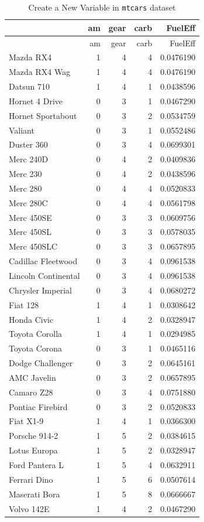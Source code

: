 \documentclass[
  letterpaper,
  paper =a4,
  twoside,
  openright,
  headsepline,
  footsepline,
  listof = totocnumbered,
  chapterprefix = true,
  firstiscover]{scrbook}
\begin{document}
\begin{longtable}[]{@{}lrrrr@{}}
\caption{Create a New Variable in \texttt{mtcars}
dataset}\tabularnewline
\toprule\noalign{}
& am & gear & carb & FuelEff \\
\midrule\noalign{}
\endfirsthead
\toprule\noalign{}
& am & gear & carb & FuelEff \\
\midrule\noalign{}
\endhead
\bottomrule\noalign{}
\endlastfoot
Mazda RX4 & 1 & 4 & 4 & 0.0476190 \\
Mazda RX4 Wag & 1 & 4 & 4 & 0.0476190 \\
Datsun 710 & 1 & 4 & 1 & 0.0438596 \\
Hornet 4 Drive & 0 & 3 & 1 & 0.0467290 \\
Hornet Sportabout & 0 & 3 & 2 & 0.0534759 \\
Valiant & 0 & 3 & 1 & 0.0552486 \\
Duster 360 & 0 & 3 & 4 & 0.0699301 \\
Merc 240D & 0 & 4 & 2 & 0.0409836 \\
Merc 230 & 0 & 4 & 2 & 0.0438596 \\
Merc 280 & 0 & 4 & 4 & 0.0520833 \\
Merc 280C & 0 & 4 & 4 & 0.0561798 \\
Merc 450SE & 0 & 3 & 3 & 0.0609756 \\
Merc 450SL & 0 & 3 & 3 & 0.0578035 \\
Merc 450SLC & 0 & 3 & 3 & 0.0657895 \\
Cadillac Fleetwood & 0 & 3 & 4 & 0.0961538 \\
Lincoln Continental & 0 & 3 & 4 & 0.0961538 \\
Chrysler Imperial & 0 & 3 & 4 & 0.0680272 \\
Fiat 128 & 1 & 4 & 1 & 0.0308642 \\
Honda Civic & 1 & 4 & 2 & 0.0328947 \\
Toyota Corolla & 1 & 4 & 1 & 0.0294985 \\
Toyota Corona & 0 & 3 & 1 & 0.0465116 \\
Dodge Challenger & 0 & 3 & 2 & 0.0645161 \\
AMC Javelin & 0 & 3 & 2 & 0.0657895 \\
Camaro Z28 & 0 & 3 & 4 & 0.0751880 \\
Pontiac Firebird & 0 & 3 & 2 & 0.0520833 \\
Fiat X1-9 & 1 & 4 & 1 & 0.0366300 \\
Porsche 914-2 & 1 & 5 & 2 & 0.0384615 \\
Lotus Europa & 1 & 5 & 2 & 0.0328947 \\
Ford Pantera L & 1 & 5 & 4 & 0.0632911 \\
Ferrari Dino & 1 & 5 & 6 & 0.0507614 \\
Maserati Bora & 1 & 5 & 8 & 0.0666667 \\
Volvo 142E & 1 & 4 & 2 & 0.0467290 \\
\end{longtable}
\end{document}
